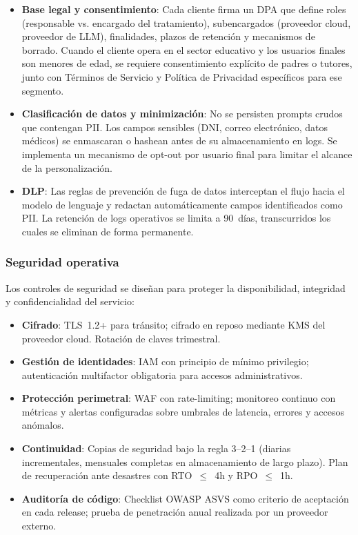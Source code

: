 \begin{itemize}
    \item \textbf{Base legal y consentimiento}: Cada cliente firma un DPA que define roles (responsable vs. encargado del tratamiento), subencargados (proveedor cloud, proveedor de LLM), finalidades, plazos de retención y mecanismos de borrado. Cuando el cliente opera en el sector educativo y los usuarios finales son menores de edad, se requiere consentimiento explícito de padres o tutores, junto con Términos de Servicio y Política de Privacidad específicos para ese segmento.
    \item \textbf{Clasificación de datos y minimización}: No se persisten prompts crudos que contengan PII. Los campos sensibles (DNI, correo electrónico, datos médicos) se enmascaran o hashean antes de su almacenamiento en logs. Se implementa un mecanismo de opt-out por usuario final para limitar el alcance de la personalización.
    \item \textbf{DLP}: Las reglas de prevención de fuga de datos interceptan el flujo hacia el modelo de lenguaje y redactan automáticamente campos identificados como PII. La retención de logs operativos se limita a 90~días, transcurridos los cuales se eliminan de forma permanente.
\end{itemize}

\subsubsection{Seguridad operativa}

Los controles de seguridad se diseñan para proteger la disponibilidad, integridad y confidencialidad del servicio:

\begin{itemize}
    \item \textbf{Cifrado}: TLS~1.2+ para tránsito; cifrado en reposo mediante KMS del proveedor cloud. Rotación de claves trimestral.
    \item \textbf{Gestión de identidades}: IAM con principio de mínimo privilegio; autenticación multifactor obligatoria para accesos administrativos.
    \item \textbf{Protección perimetral}: WAF con rate-limiting; monitoreo continuo con métricas y alertas configuradas sobre umbrales de latencia, errores y accesos anómalos.
    \item \textbf{Continuidad}: Copias de seguridad bajo la regla 3--2--1 (diarias incrementales, mensuales completas en almacenamiento de largo plazo). Plan de recuperación ante desastres con RTO~$\leq$~4h y RPO~$\leq$~1h.
    \item \textbf{Auditoría de código}: Checklist OWASP ASVS como criterio de aceptación en cada release; prueba de penetración anual realizada por un proveedor externo.
\end{itemize}

